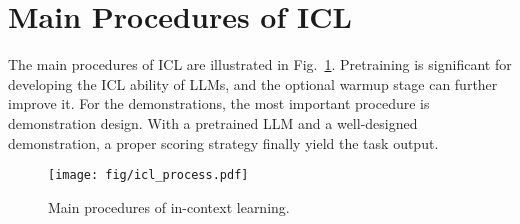 \section{Main Procedures of ICL}
The main procedures of ICL are illustrated in Fig.~\ref{fig:icl_process}. Pretraining is significant for developing the ICL ability of LLMs, and the optional warmup stage can further improve it. For the demonstrations, the most important procedure is demonstration design. With a pretrained LLM and a well-designed demonstration, a proper scoring strategy finally yield the task output.
\begin{figure}[h]
    \centering
    \texttt{[image: fig/icl\_process.pdf]}
    \caption{Main procedures of in-context learning.}
    \label{fig:icl_process}
\end{figure}

